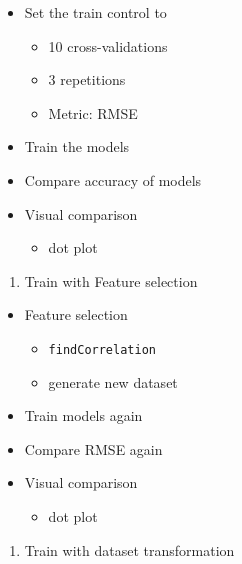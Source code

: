 \documentclass[]{book}
\providecommand{\tightlist}{%
  \setlength{\itemsep}{0pt}\setlength{\parskip}{0pt}}
\begin{document}
\begin{itemize}
\tightlist
\item
  Set the train control to

  \begin{itemize}
  \tightlist
  \item
    10 cross-validations
  \item
    3 repetitions
  \item
    Metric: RMSE
  \end{itemize}
\item
  Train the models
\item
  Compare accuracy of models
\item
  Visual comparison

  \begin{itemize}
  \tightlist
  \item
    dot plot
  \end{itemize}
\end{itemize}

\begin{enumerate}
\def\labelenumi{\arabic{enumi}.}
\setcounter{enumi}{5}
\tightlist
\item
  Train with Feature selection
\end{enumerate}

\begin{itemize}
\tightlist
\item
  Feature selection

  \begin{itemize}
  \tightlist
  \item
    \texttt{findCorrelation}
  \item
    generate new dataset
  \end{itemize}
\item
  Train models again\\
\item
  Compare RMSE again
\item
  Visual comparison

  \begin{itemize}
  \tightlist
  \item
    dot plot\\
  \end{itemize}
\end{itemize}

\begin{enumerate}
\def\labelenumi{\arabic{enumi}.}
\setcounter{enumi}{6}
\tightlist
\item
  Train with dataset transformation
\end{enumerate}
\end{document}
